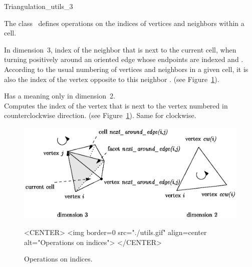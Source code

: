 

\begin{ccRefClass}{Triangulation_utils_3}

\ccDefinition
  
The class \ccRefName\ defines operations on the indices of vertices
and neighbors within a cell.


\ccOperations


{In dimension~3, index of the neighbor  that is next to the current cell,
when turning positively around an oriented edge whose endpoints are
indexed  and . According to the usual numbering of
vertices and neighbors in a given cell, it is also the index of the vertex 
opposite to this neighbor . (see Figure~\ref{Triangulation3-fig-utils}).
}

{Has a meaning only in dimension~2.\\
 Computes the index of the vertex that is next to the vertex numbered
 in counterclockwise direction. (see
Figure~\ref{Triangulation3-fig-utils}).  
}
\ccGlue
{}
{Same for clockwise.}

\begin{figure}[htbp]
\begin{ccTexOnly}
\begin{center} 
\includegraphics{utils.eps} 
\end{center}
\end{ccTexOnly}
\caption{Operations on indices.
\label{Triangulation3-fig-utils}}
\begin{ccHtmlOnly}
<CENTER>
<img border=0 src="./utils.gif" align=center alt="Operations on indices">
</CENTER>
\end{ccHtmlOnly}
\end{figure} 

\end{ccRefClass}
